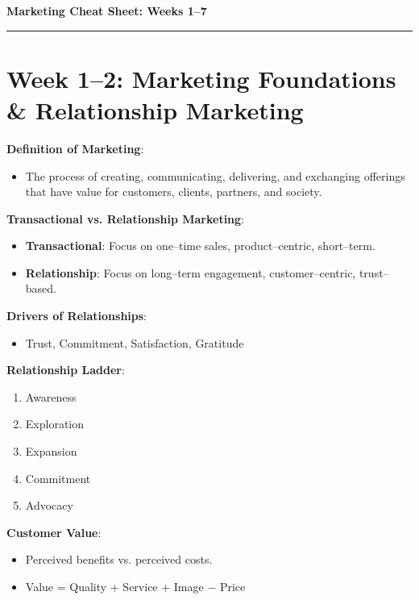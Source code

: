 \documentclass[12pt]{article}
\begin{document}
\begin{center}
    \LARGE\textbf{Marketing Cheat Sheet: Weeks 1–7}
\end{center}
\hrule
\vspace{1em}

\section*{\faChartBar\hspace{0.5em} Week 1–2: Marketing Foundations \& Relationship Marketing}

\textbf{Definition of Marketing}:
\begin{itemize}[leftmargin=*]
    \item The process of creating, communicating, delivering, and exchanging offerings that have value for customers, clients, partners, and society.
\end{itemize}

\textbf{Transactional vs. Relationship Marketing}:
\begin{itemize}[leftmargin=*]
    \item \textbf{Transactional}: Focus on one--time sales, product--centric, short--term.
    \item \textbf{Relationship}: Focus on long--term engagement, customer--centric, trust--based.
\end{itemize}

\textbf{Drivers of Relationships}:
\begin{itemize}[leftmargin=*]
    \item Trust, Commitment, Satisfaction, Gratitude
\end{itemize}

\textbf{Relationship Ladder}:
\begin{enumerate}[leftmargin=*]
    \item Awareness
    \item Exploration
    \item Expansion
    \item Commitment
    \item Advocacy
\end{enumerate}

\textbf{Customer Value}:
\begin{itemize}[leftmargin=*]
    \item Perceived benefits vs. perceived costs.
    \item Value = Quality + Service + Image − Price
\end{itemize}
\end{document}
